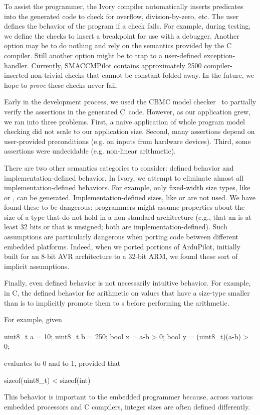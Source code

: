 To assist the programmer, the Ivory compiler automatically inserts predicates
into the generated code to check for overflow, division-by-zero, etc.  The user
defines the behavior of the program if a check fails.  For example, during
testing, we define the checks to insert a breakpoint for use with a debugger.
Another option may be to do nothing and rely on the semantics provided by the C
compiler.  Still another option might be to trap to a user-defined
exception-handler.  Currently, SMACCMPilot contains approximately 2500
compiler-inserted non-trivial checks that cannot be constant-folded away.
In the future, we hope to \emph{prove} these checks never fail.

Early in the
development process, we used the CBMC model checker~\cite{cbmc} to partially
verify the assertions in the generated C~code. However, as our
application grew, we ran into three problems. First, a naive application
of whole program model checking did not scale to our application size. Second,
many assertions depend on user-provided preconditions (e.g. on inputs from
hardware devices). Third, some assertions were undecidable (e.g. non-linear
arithmetic).

There are two other semantics categories to consider: defined behavior and
implementation-defined behavior.  In Ivory, we attempt to eliminate almost all
implementation-defined behaviors.  For example, only fixed-width size types,
like  or , can be generated.  Implementation-defined
sizes, like  or  are not used.  We have found these to be
dangerous: programmers might assume properties about the size of a type that do not
hold in a non-standard architecture (e.g., that an  is at least 32 bits
or that  is unsigned; both are implementation-defined).  Such
assumptions are particularly dangerous when porting code between different
embedded platforms.  Indeed, when we ported portions of ArduPilot, initially built
for an 8-bit AVR architecture to a 32-bit ARM, we found these sort of implicit
assumptions.

Finally, even defined behavior is not necessarily intuitive behavior.  For
example, in C, the defined behavior for arithmetic on values that have a
size-type smaller than  is to implicitly promote them to s before
performing the arithmetic.

For example, given
\begin{code}
uint8\_t a = 10;
uint8\_t b = 250;
bool    x = a-b > 0;
bool    y = (uint8\_t)(a-b) > 0;
\end{code}
\noindent
{} evaluates to 0 and  to 1, provided that
\begin{code}
sizeof(uint8\_t) < sizeof(int)
\end{code}
\noindent
This behavior is important to the embedded programmer because, across various
embedded processors and C compilers, integer sizes are often defined
differently.

